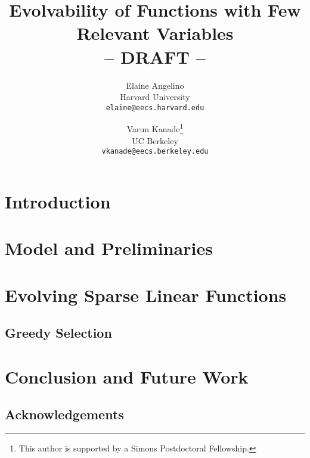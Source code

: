 \documentclass[11pt]{article}
\begin{document}
\title{Evolvability of Functions with Few Relevant Variables \\ 
\small{ -- DRAFT -- }}
\author{Elaine Angelino \\
Harvard University \\ \texttt{elaine@eecs.harvard.edu} \and Varun
Kanade\thanks{This author is supported by a Simons Postdoctoral Fellowship.} \\
UC Berkeley \\ \texttt{vkanade@eecs.berkeley.edu}}

\maketitle

\begin{abstract}

\end{abstract}

\newpage

\section{Introduction}
\label{sec:introduction}


\section{Model and Preliminaries}
\label{sec:notation}


\section{Evolving Sparse Linear Functions}
\label{sec:sparse_linear}


\subsection{Greedy Selection}
\label{sec:greedy}


% 
% 
% 

\section{Conclusion and Future Work}
\label{sec:conclusion}


\subsection*{Acknowledgements} 



\end{document}
